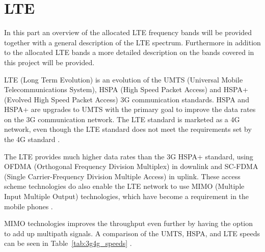 \section{LTE}
\label{sec:lte}
In this part an overview of the allocated LTE frequency bands will be provided together with a general description of the LTE spectrum.
Furthermore in addition to the allocated LTE bands a more detailed description on the bands covered in this project will be provided.

LTE (Long Term Evolution) is an evolution of the UMTS (Universal Mobile Telecommunications System), HSPA (High Speed Packet Access) and HSPA+ (Evolved High Speed Packet Access) 3G communication standards. HSPA and HSPA+ are upgrades to UMTS with the primary goal to improve the data rates on the 3G communication network. The LTE standard is marketed as a 4G network, even though the LTE standard does not meet the requirements set by the 4G standard \cite{radio2015electronics}.

The LTE provides much higher data rates than the 3G HSPA+ standard, using OFDMA (Orthogonal Frequency Division Multiplex) in downlink and SC-FDMA (Single Carrier-Frequency Division Multiple Access) in uplink. These access scheme technologies do also  enable the LTE network to use MIMO (Multiple Input Multiple Output) technologies, which have become a requirement in the mobile phones \cite{radio2015electronics}.

MIMO technologies improves the throughput even further by having the option to add up multipath signals. A comparison of the UMTS, HSPA, and LTE speeds can be seen in Table~\ref{tab:3g4g_speeds} \cite{radio2015electronics}.

